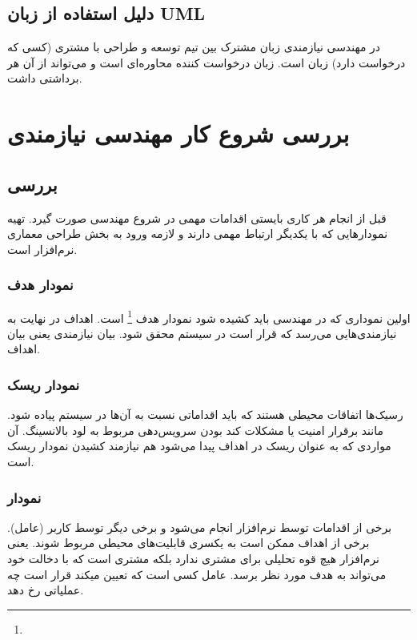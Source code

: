 \subsection{دلیل استفاده از زبان UML}

در مهندسی نیازمندی زبان مشترک بین تیم توسعه و طراحی با مشتری (کسی که درخواست
دارد) زبان  است. زبان درخواست کننده محاوره‌ای است و می‌تواند از آن هر
برداشتی داشت.

\section{بررسی شروع کار مهندسی نیازمندی}

\subsection{بررسی }

قبل از انجام هر کاری بایستی اقدامات مهمی در شروع مهندسی صورت گیرد. تهیه
نمودار‌هایی که با یکدیگر ارتباط مهمی دارند و لازمه ورود به بخش طراحی معماری
نرم‌افزار است.

\subsubsection{نمودار هدف}

اولین نموداری که در مهندسی باید کشیده شود نمودار هدف \footnote{} است. اهداف در نهایت به نیازمندی‌هایی می‌رسد که قرار است در سیستم محقق
شود. بیان نیازمندی یعنی بیان اهداف.

\subsubsection{نمودار ریسک}

رسیک‌ها اتفاقات محیطی هستند که باید اقداماتی نسبت به آن‌ها در سیستم پیاده شود.
مانند برقرار امنیت یا مشکلات کند بودن سرویس‌دهی مربوط به لود بالانسینگ. آن
مواردی که به عنوان ریسک در اهداف پیدا می‌شود هم نیازمند کشیدن نمودار ریسک است.

\subsubsection{نمودار }

برخی از اقدامات توسط نرم‌افزار انجام می‌شود و برخی دیگر توسط کاربر (عامل). برخی
از اهداف ممکن است به یکسری قابلیت‌های محیطی مربوط شوند. یعنی نرم‌افزار هیچ قوه
تحلیلی برای مشتری ندارد بلکه مشتری است که با دخالت خود می‌تواند به هدف مورد نظر
برسد. عامل کسی است که تعیین میکند قرار است چه عملیاتی رخ دهد.

